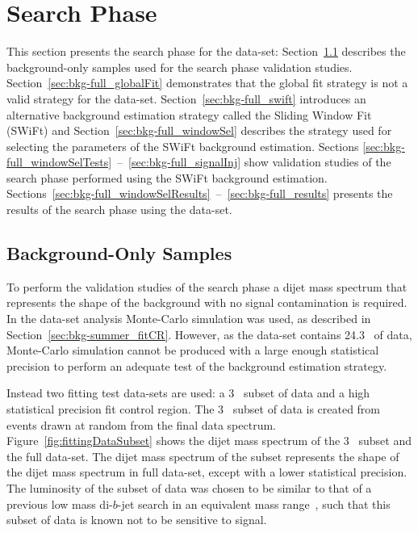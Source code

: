 \clearpage
\section{\lm{} Search Phase}
\label{sec:bkg-full}

This section presents the search phase for the \lm{} data-set:
Section~\ref{sec:bkg-full_fitCR} describes the background-only samples used for the search phase validation studies.
Section~\ref{sec:bkg-full_globalFit} demonstrates that the global fit strategy is not a valid strategy for the \lm{} data-set.
Section~\ref{sec:bkg-full_swift} introduces an alternative background estimation strategy called the Sliding Window Fit (SWiFt)
and Section~\ref{sec:bkg-full_windowSel} describes the strategy used for selecting the parameters of the SWiFt background estimation.
Sections \ref{sec:bkg-full_windowSelTests}~--~\ref{sec:bkg-full_signalInj} show validation studies
of the search phase performed using the SWiFt background estimation.
Sections~\ref{sec:bkg-full_windowSelResults}~--~\ref{sec:bkg-full_results} presents the results of the search phase using the \lm{} data-set.

\subsection{Background-Only Samples}
\label{sec:bkg-full_fitCR}


To perform the validation studies of the \lm{} search phase
a dijet mass spectrum that represents the shape of the background with no signal contamination is required.
In the \summer{} data-set analysis Monte-Carlo simulation was used,
as described in Section~\ref{sec:bkg-summer_fitCR}.
However, as the \lm{} data-set contains 24.3~\ifb{} of data, Monte-Carlo simulation cannot be produced with a large enough statistical
precision to perform an adequate test of the background estimation strategy.

Instead two fitting test data-sets are used:
a 3~\ifb{} subset of data and a high statistical precision fit control region.
The 3~\ifb{} subset of data is created from events drawn at random from the final data spectrum.
Figure~\ref{fig:fittingDataSubset} shows the dijet mass spectrum of the 3~\ifb{} subset and the full \lm{} data-set.
The dijet mass spectrum of the subset represents the shape of the dijet mass spectrum in full data-set,
except with a lower statistical precision.
The luminosity of the subset of data was chosen to be similar to that of a
previous low mass di-$b$-jet search in an equivalent mass range~\cite{dibjet-lhcp_conf},
such that this subset of data is known not to be sensitive to signal.

